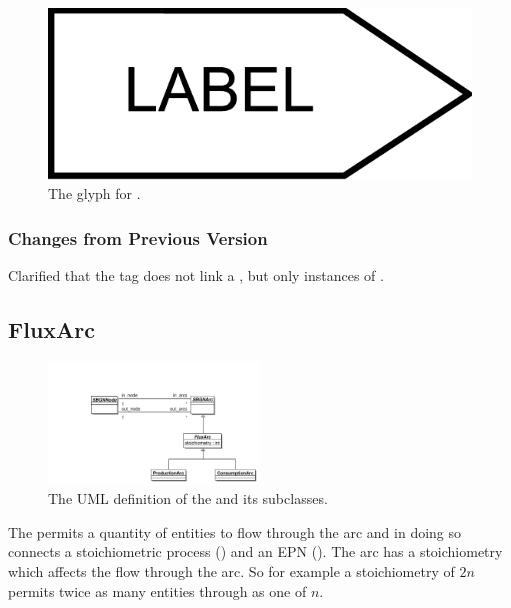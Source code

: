 \begin{figure}[H]
  \centering
  \includegraphics[scale = 0.3]{images/tag}
  \caption{The \PD glyph for .}
  \label{fig:tag}
\end{figure}

\subsubsection{Changes from Previous Version}

Clarified that the tag does not link a , but
only instances of .

\subsection{FluxArc}
\label{defn:FluxArc}

\begin{figure}[htb]
  \centering
  \includegraphics[width = 0.5\textwidth]{images/fluxarcuml}
  \caption{The UML definition of the  and its subclasses.}
  \label{fig:fluxarcuml}
\end{figure}
 
The  permits a quantity of entities to flow through
the arc and in doing so connects a stoichiometric process
() and an EPN
(). The arc has a stoichiometry which affects
the flow through the arc. So for example a stoichiometry of $2n$
permits twice as many entities through as one of $n$.

